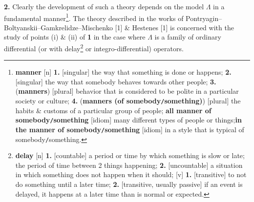 \documentclass[oneside]{book}
\numberwithin{equation}{section}
\begin{document}
\textbf{2.} Clearly the development of such a theory depends on the model $\Lambda$ in a fundamental manner\footnote{\textbf{manner} [n] \textbf{1.} [singular] the way that something is done or happens; \textbf{2.} [singular] the way that somebody behaves towards other people; \textbf{3.} (\textbf{manners}) [plural] behavior that is considered to be polite in a particular society or culture; \textbf{4.} (\textbf{manners (of somebody\texttt{/}something)}) [plural] the habits \& customs of a particular group of people; \textbf{all manner of somebody\texttt{/}something} [idiom] many different types of people or things;\textbf{in the manner of somebody\texttt{/}something} [idiom] in a style that is typical of somebody\texttt{/}something.}. The theory described in the works of Pontryagin--Boltyanskii--Gamkrelidze--Mischenko [1] \& Hestenes [1] is concerned with the study of points (i) \& (ii) of \textbf{1} in the case where $\Lambda$ is a family of ordinary differential (or with delay\footnote{\textbf{delay} [n] \textbf{1.} [countable] a period or time by which something is slow or late; the period of time between 2 things happening; \textbf{2.} [uncountable] a situation in which something does not happen when it should; [v] \textbf{1.} [transitive] to not do something until a later time; \textbf{2.} [transitive, usually passive] if an event is delayed, it happens at a later time than is normal or expected.} or integro-differential) operators.
\end{document}

